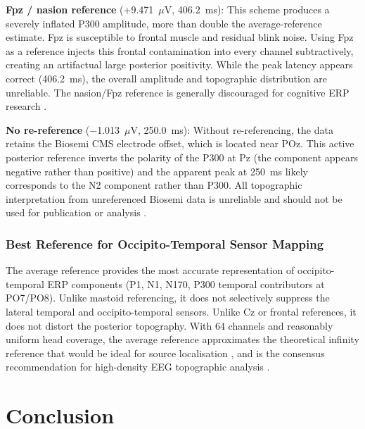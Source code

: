 \documentclass[11pt, a4paper, twocolumn]{article}
\begin{document}
\textbf{Fpz / nasion reference} (+9.471~$\mu$V, 406.2~ms): This scheme
produces a severely inflated P300 amplitude, more than double the
average-reference estimate. Fpz is susceptible to frontal muscle and
residual blink noise. Using Fpz as a reference injects this frontal
contamination into every channel subtractively, creating an artifactual
large posterior positivity. While the peak latency appears correct
(406.2~ms), the overall amplitude and topographic distribution are
unreliable. The nasion/Fpz reference is generally discouraged for
cognitive ERP research \citep{Nunez1999}.

\textbf{No re-reference} ($-$1.013~$\mu$V, 250.0~ms): Without
re-referencing, the data retains the Biosemi CMS electrode offset, which
is located near POz. This active posterior reference inverts the polarity
of the P300 at Pz (the component appears negative rather than positive)
and the apparent peak at 250~ms likely corresponds to the N2 component
rather than P300. All topographic interpretation from unreferenced Biosemi
data is unreliable and should not be used for publication or analysis
\citep{NunezSrinivasan2006}.

\subsubsection{Best Reference for Occipito-Temporal Sensor Mapping}

The average reference provides the most accurate representation of
occipito-temporal ERP components (P1, N1, N170, P300 temporal contributors
at PO7/PO8). Unlike mastoid referencing, it does not selectively suppress
the lateral temporal and occipito-temporal sensors. Unlike Cz or frontal
references, it does not distort the posterior topography. With 64 channels
and reasonably uniform head coverage, the average reference approximates
the theoretical infinity reference that would be ideal for source
localisation \citep{Yao2001}, and is the consensus recommendation for
high-density EEG topographic analysis \citep{Luck2005, HariPuce2017}.

\section{Conclusion}
\end{document}
